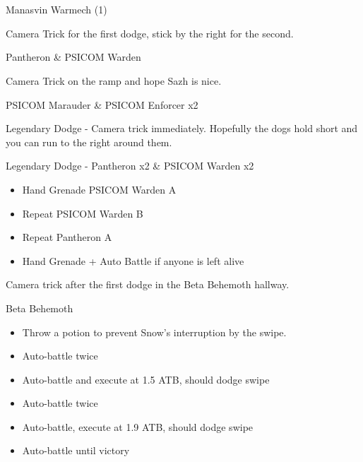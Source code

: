 \chapter[Chapter 1]{}

\begin{battle}{Manasvin Warmech (1)}
\end{battle}

Camera Trick for the first dodge, stick by the right for the second.

\begin{battle}{Pantheron \& PSICOM Warden}
\end{battle}

Camera Trick on the ramp and hope Sazh is nice.

\begin{battle}{PSICOM Marauder \& PSICOM Enforcer x2}
\end{battle}

Legendary Dodge - Camera trick immediately. Hopefully the dogs hold short and you can run to the right around them.

\begin{battle}{Legendary Dodge - Pantheron x2 \& PSICOM Warden x2}
	\begin{itemize}
		\item Hand Grenade PSICOM Warden A
		\item Repeat PSICOM Warden B
		\item Repeat Pantheron A
		\item Hand Grenade + Auto Battle if anyone is left alive
	\end{itemize}

\end{battle}

Camera trick after the first dodge in the Beta Behemoth hallway.

\begin{battle}{Beta Behemoth}
	\begin{itemize}
		\item Throw a potion to prevent Snow's interruption by the swipe.
		\item Auto-battle twice
		\item Auto-battle and execute at 1.5 ATB, should dodge swipe
		\item Auto-battle twice
		\item Auto-battle, execute at 1.9 ATB, should dodge swipe
		\item Auto-battle until victory
	\end{itemize}
\end{battle}

